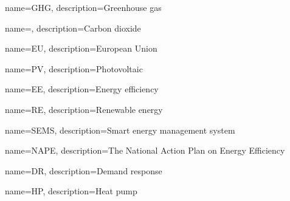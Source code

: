 \makeglossaries

{
    name=GHG,
    description={Greenhouse gas}
}

{
    name=,
    description={Carbon dioxide}
}

{
    name=EU,
    description={European Union}
}

{
    name=PV,
    description={Photovoltaic}
}

{
    name=EE,
    description={Energy efficiency}
}

{
    name=RE,
    description={Renewable energy}
}

{
    name=SEMS,
    description={Smart energy management system}
}

{
    name=NAPE,
    description={The National Action Plan on Energy Efficiency}
}

{
    name=DR,
    description={Demand response}
}

{
    name=HP,
    description={Heat pump}
}